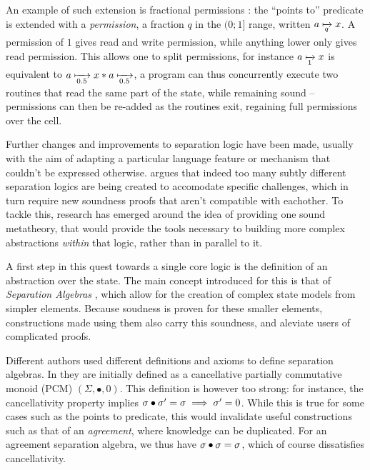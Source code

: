 An example of such extension is fractional permissions \cite{fracpermissions, fracpermissions2}: the ``points to'' predicate is extended with a \emph{permission}, a fraction $q$ in the $(0;1]$ range, written $a \mapstoq{q} x$. A permission of $1$ gives read and write permission, while anything lower only gives read permission. This allows one to split permissions, for instance $a \mapstoq{1} x$ is equivalent to $a\mapstoq{0.5}x * a\mapstoq{0.5}$, a program can thus concurrently execute two routines that read the same part of the state, while remaining sound -- permissions can then be re-added as the routines exit, regaining full permissions over the cell.

Further changes and improvements to separation logic have been made, usually with the aim of adapting a particular language feature or mechanism that couldn't be expressed otherwise.  argues that indeed too many subtly different separation logics are being created to accomodate specific challenges, which in turn require new soundness proofs that aren't compatible with eachother. To tackle this, research has emerged around the idea of providing one sound metatheory, that would provide the tools necessary to building more complex abstractions \emph{within} that logic, rather than in parallel to it.

A first step in this quest towards a single core logic is the definition of an abstraction over the state. The main concept introduced for this is that of \emph{Separation Algebras} \cite{abstractseplogic, sepalgebra}, which allow for the creation of complex state models from simpler elements. Because soudness is proven for these smaller elements, constructions made using them also carry this soundness, and aleviate users of complicated proofs.

Different authors used different definitions and axioms to define separation algebras. In \cite{abstractseplogic} they are initially defined as a cancellative partially commutative monoid (PCM) $(\Sigma, \bullet, 0)$. This definition is however too strong: for instance, the cancellativity property implies $\sigma\bullet\sigma'=\sigma \implies \sigma'=0$. While this is true for some cases such as the points to predicate, this would invalidate useful constructions such as that of an \emph{agreement}, where knowledge can be duplicated. For an agreement separation algebra, we thus have $\sigma \bullet \sigma = \sigma$, which of course dissatisfies cancellativity. 

